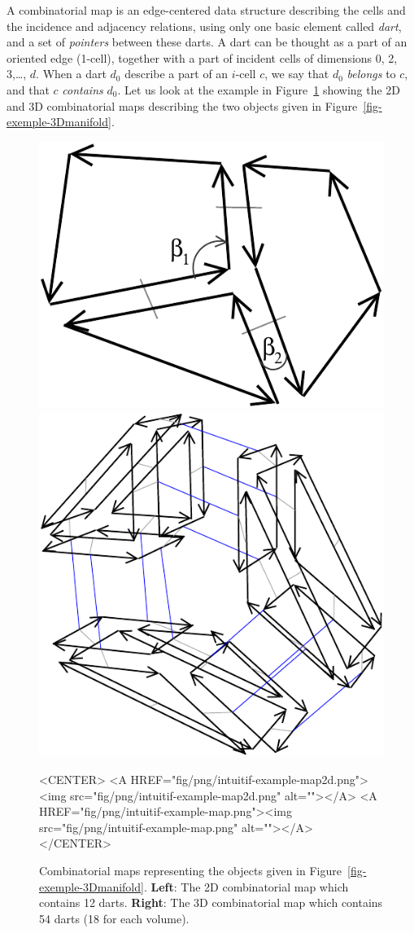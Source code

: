 A combinatorial map is an edge-centered data structure describing the
cells and the incidence and adjacency relations, using only one basic
element called \emph{dart}, and a set of \emph{pointers} between these
darts.  A dart can be thought as a part of an oriented edge (1-cell),
together with a part of incident cells of dimensions 0, 2, 3,\ldots,
$d$. When a dart $d_0$ describe a part of an $i$-cell $c$, we say that
$d_0$ \emph{belongs} to $c$, and that $c$ \emph{contains} $d_0$.  Let
us look at the example in Figure~\ref{fig-exemple-combi-maps} showing
the 2D and 3D combinatorial maps describing the two objects given in
Figure~\ref{fig-exemple-3Dmanifold}.
\begin{figure}[ht]
  \begin{ccTexOnly}
    \begin{center}
      \includegraphics[width=.3\textwidth]
      {Combinatorial_map/fig/pdf/intuitif-example-map2d}
      \qquad
      \includegraphics[width=.4\textwidth]
      {Combinatorial_map/fig/pdf/intuitif-example-map}
    \end{center}
  \end{ccTexOnly}
  \begin{ccHtmlOnly}
    <CENTER>
    <A HREF="fig/png/intuitif-example-map2d.png"><img src="fig/png/intuitif-example-map2d.png" alt=""></A>
    <A HREF="fig/png/intuitif-example-map.png"><img src="fig/png/intuitif-example-map.png" alt=""></A>
    </CENTER>
    \end{ccHtmlOnly}
    \caption{Combinatorial maps representing the objects given in 
      Figure~\ref{fig-exemple-3Dmanifold}.
      \textbf{Left}: The 2D combinatorial map which contains 12 darts.
      \textbf{Right}: The 3D combinatorial map which contains 54 darts
      (18 for each volume).
    }
    \label{fig-exemple-combi-maps}
\end{figure}

